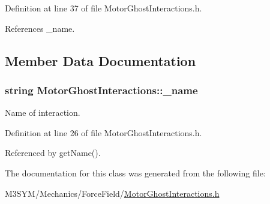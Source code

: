 Definition at line 37 of file Motor\+Ghost\+Interactions.\+h.



References \+\_\+name.



\subsection{Member Data Documentation}
\hypertarget{classMotorGhostInteractions_ab5dfb52e5d74049a5f03e4671b649756}{
\subsubsection[{\+\_\+name}]{\setlength{\rightskip}{0pt plus 5cm}string Motor\+Ghost\+Interactions\+::\+\_\+name\hspace{0.3cm}{\ttfamily [private]}}}\label{classMotorGhostInteractions_ab5dfb52e5d74049a5f03e4671b649756}


Name of interaction. 



Definition at line 26 of file Motor\+Ghost\+Interactions.\+h.



Referenced by get\+Name().



The documentation for this class was generated from the following file\+:\begin{DoxyCompactItemize}
\item 
M3\+S\+Y\+M/\+Mechanics/\+Force\+Field/\hyperlink{MotorGhostInteractions_8h}{Motor\+Ghost\+Interactions.\+h}\end{DoxyCompactItemize}
